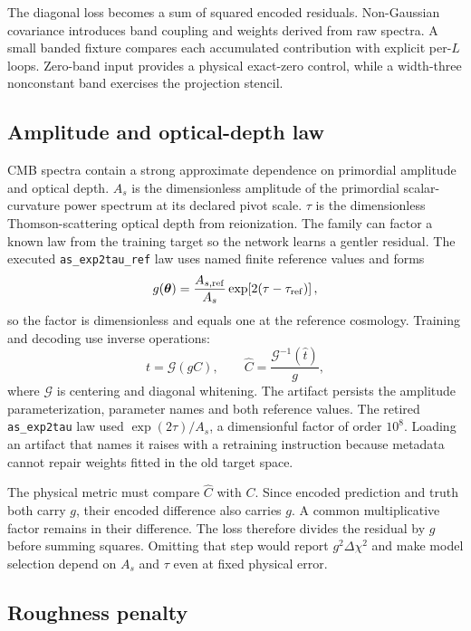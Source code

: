 \documentclass[10pt,aps,prd,twocolumn,nofootinbib]{revtex4-2}
\newcommand{\code}[1]{\texttt{#1}}
\newcommand{\btheta}{\boldsymbol{\theta}}
\begin{document}
The diagonal loss becomes a sum of squared encoded residuals.  Non-Gaussian
covariance introduces band coupling and weights derived from raw spectra.  A
small banded fixture compares each accumulated contribution with explicit
per-\(L\) loops.  Zero-band input provides a physical exact-zero control, while
a width-three nonconstant band exercises the projection stencil.

\subsection{Amplitude and optical-depth law}

CMB spectra contain a strong approximate dependence on primordial amplitude
and optical depth.  $A_s$ is the dimensionless amplitude of the primordial
scalar-curvature power spectrum at its declared pivot scale.  $\tau$ is the
dimensionless Thomson-scattering optical depth from reionization.  The family can factor a known law from the training target
so the network learns a gentler residual.  The executed
\code{as\_exp2tau\_ref} law uses named finite reference values and forms
\begin{equation*}
 g(\btheta)
 =\frac{A_{s,{\rm ref}}}{A_s}
  \exp\!\left[2(\tau-\tau_{\rm ref})\right],
\end{equation*}
so the factor is dimensionless and equals one at the reference cosmology.
Training and decoding use inverse operations:
\begin{equation*}
  t=\mathcal G\!\left(gC\right),\qquad
  \widehat C=\frac{\mathcal G^{-1}(\widehat t)}{g},
\end{equation*}
where \(\mathcal G\) is centering and diagonal whitening.  The artifact
persists the amplitude parameterization, parameter names and both reference
values.  The retired \code{as\_exp2tau} law used
\(\exp(2\tau)/A_s\), a dimensionful factor of order \(10^8\).  Loading an
artifact that names it raises with a retraining instruction because metadata
cannot repair weights fitted in the old target space.

The physical metric must compare \(\widehat C\) with \(C\).  Since encoded
prediction and truth both carry \(g\), their encoded difference also carries
\(g\).  A common multiplicative factor remains in their difference.  The loss
therefore divides the residual by \(g\) before summing squares.  Omitting that
step would report \(g^2\Delta\chi^2\) and make model selection depend on
\(A_s\) and \(\tau\) even at fixed physical error.

\subsection{Roughness penalty}
\end{document}
